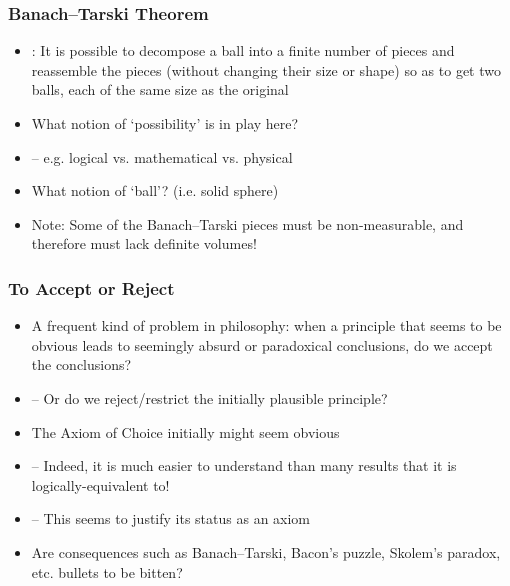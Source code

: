 \begin{frame}
\frametitle{Banach--Tarski Theorem}

\begin{itemize}[<+->]

\item {}: It is possible to decompose a ball into a finite number of pieces and reassemble the pieces (without changing their size or shape) so as to get two balls, each of the same size as the original

\item What notion of `possibility' is in play here?

\item[] -- e.g. logical vs. mathematical vs. physical

\item What notion of `ball'? (i.e. solid sphere)

\item Note: Some of the Banach--Tarski pieces must be non-measurable, and therefore must lack definite volumes!


\end{itemize}
\end{frame}

\begin{frame}
\frametitle{To Accept or Reject}

\begin{itemize}[<+->]

\item A frequent kind of problem in philosophy: when a principle that seems to be obvious leads to seemingly absurd or paradoxical conclusions, do we accept the conclusions?

\item[] -- Or do we reject/restrict the initially plausible principle?

\item The Axiom of Choice initially might seem obvious 
\item[] -- Indeed, it is much easier to understand than many results that it is logically-equivalent to! 
\item[] -- This seems to justify its status as an axiom

\item Are consequences such as Banach--Tarski, Bacon's puzzle, Skolem's paradox, etc. bullets to be bitten?

\end{itemize}
\end{frame}


